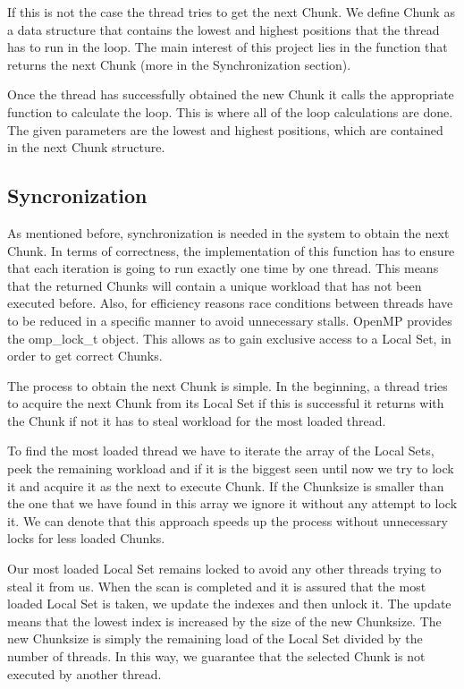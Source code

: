 \documentclass[12pt,a4paper]{article}
\begin{document}
If this is not the case the thread tries to get the next Chunk. We define Chunk as a data structure that contains the lowest and highest positions that the thread has to run in the loop. The main interest of this project lies in the function that returns the next Chunk (more in the Synchronization section).

Once the thread has successfully obtained the new Chunk it calls the appropriate function to calculate the loop. This is where all of the loop calculations are done. The given parameters are the lowest and highest positions, which are contained in the next Chunk structure.

\subsection{Syncronization}
As mentioned before, synchronization is needed in the system to obtain the next Chunk. In terms of correctness, the implementation of this function has to ensure that each iteration is going to run exactly one time by one thread. This means that the returned Chunks will contain a unique workload that has not been executed before. Also, for efficiency reasons race conditions between threads have to be reduced in a specific manner to avoid unnecessary stalls. OpenMP provides the omp\_lock\_t object. This allows as to gain exclusive access to a Local Set, in order to get correct Chunks.

The process to obtain the next Chunk is simple. In the beginning, a thread tries to acquire the next Chunk from its Local Set if this is successful it returns with the Chunk if not it has to steal workload for the most loaded thread.

To find the most loaded thread we have to iterate the array of the Local Sets, peek the remaining workload and if it is the biggest seen until now we try to lock it and acquire it as the next to execute Chunk. If the Chunksize is smaller than the one that we have found in this array we ignore it without any attempt to lock it. We can denote that this approach speeds up the process without unnecessary locks for less loaded Chunks. 

Our most loaded Local Set remains locked to avoid any other threads trying to steal it from us. When the scan is completed and it is assured that the most loaded Local Set is taken, we update the indexes and then unlock it. The update means that the lowest index is increased by the size of the new Chunksize. The new Chunksize is simply the remaining load of the Local Set divided by the number of threads. In this way, we guarantee that the selected Chunk is not executed by another thread. 
\end{document}
